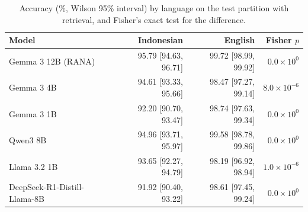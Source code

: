 \begin{table}[t]
\renewcommand{\tblwidth}{\textwidth}%
\small
\centering
\caption{Accuracy (\%, Wilson 95\% interval) by language on the test partition with retrieval, and Fisher's exact test for the difference.}\label{tbl_lang}
\begin{tabular*}{\tblwidth}{@{\extracolsep{\fill}}LRRR@{}}
\toprule
\textbf{Model} & \textbf{Indonesian} & \textbf{English} & \textbf{Fisher $p$} \\
\midrule
Gemma 3 12B (RANA) & 95.79 [94.63, 96.71] & 99.72 [98.99, 99.92] & $0.0\times10^{0}$ \\
Gemma 3 4B & 94.61 [93.33, 95.66] & 98.47 [97.27, 99.14] & $8.0\times10^{-6}$ \\
Gemma 3 1B & 92.20 [90.70, 93.47] & 98.74 [97.63, 99.34] & $0.0\times10^{0}$ \\
Qwen3 8B & 94.96 [93.71, 95.97] & 99.58 [98.78, 99.86] & $0.0\times10^{0}$ \\
Llama 3.2 1B & 93.65 [92.27, 94.79] & 98.19 [96.92, 98.94] & $1.0\times10^{-6}$ \\
DeepSeek-R1-Distill-Llama-8B & 91.92 [90.40, 93.22] & 98.61 [97.45, 99.24] & $0.0\times10^{0}$ \\
\bottomrule
\end{tabular*}
\end{table}
